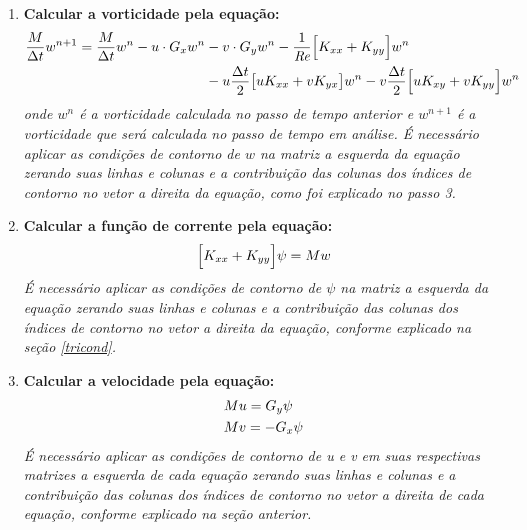 \begin{enumerate}
 \item \textbf{Calcular a vorticidade pela equação:}
  \begin{equation}
  \begin{aligned}
   \frac{M}{\Delta t} w^{n+1}
   =  \frac{M}{\Delta t} w^{n}
   - u \cdot G_x w^{n}
   &- v \cdot G_y w^{n} 
   - \frac{1}{\textit{Re}} \Big[ K_{xx} + K_{yy} \Big] w^{n}
   \\
   & - u
   \frac{\Delta t}{2}
   \big[
   u K_{xx}
   + v K_{yx}
   \big]
   w^{n} 
   - v
   \frac{\Delta t}{2}
   \Big[
   u K_{xy}
   + v K_{yy}
   \Big]
   w^{n} \notag
  \end{aligned}
  \end{equation}
  \textit{onde $w^{n}$ é a vorticidade calculada no passo de tempo anterior 
  e $w^{n+1}$ é a vorticidade que será calculada no passo de tempo em análise. 
  É necessário aplicar as condições de contorno de $w$ na matriz a esquerda da equação
  zerando suas linhas e colunas e a contribuição das colunas dos índices de contorno 
  no vetor a direita da equação,
  como foi explicado no passo 3.}

 \item \textbf{Calcular a função de corrente pela equação:}
  \begin{equation}
  \Big[ K_{xx} + K_{yy} \Big] \psi = Mw \notag
  \end{equation}
  \textit{É necessário aplicar as condições de contorno de $\psi$ na matriz a esquerda da equação
  zerando suas linhas e colunas e a contribuição das colunas dos índices de contorno 
  no vetor a direita da equação,
  conforme explicado na seção \ref{tricond}.}


 \item \textbf{Calcular a velocidade pela equação:}
  \begin{align}
   & Mu = G_{y}\psi  \notag \\
   & Mv = -G_{x}\psi \notag
  \end{align}
  \textit{É necessário aplicar as condições de contorno de u e v em suas 
  respectivas matrizes a esquerda de cada equação
  zerando suas linhas e colunas e a contribuição das colunas dos índices de contorno 
  no vetor a direita de cada equação,
  conforme explicado na seção anterior.}



\end{enumerate}
